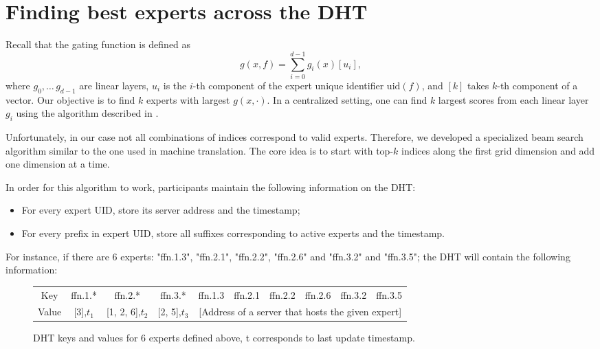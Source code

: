 \section{Finding best experts across the DHT}\label{appendix:find_experts}
\vspace{-2px}

Recall that the gating function is defined as 
\[
g(x, f) = \sum_{i=0}^{d - 1} g_i(x)[u_i],
\]
where $g_0,\dots\,g_{d-1}$ are linear layers, $u_i$ is the $i$-th component of the expert unique identifier $\mathrm{uid}(f)$, and $[k]$ takes $k$-th component of a vector. Our objective is to find $k$ experts with largest $g(x, \cdot)$. In a centralized setting, one can find $k$ largest scores from each linear layer $g_i$ using the algorithm described in \cite{pkm}.

Unfortunately, in our case not all combinations of indices correspond to valid experts. Therefore, we developed a specialized beam search algorithm similar to the one used in machine translation. The core idea is to start with top-$k$ indices along the first grid dimension and add one dimension at a time.

In order for this algorithm to work, participants maintain the following information on the DHT:

\begin{itemize}
    \item For every expert UID, store its server address and the timestamp;
    \item For every prefix in expert UID, store all suffixes corresponding to active experts and the timestamp.
\end{itemize}

For instance, if there are 6 experts: "ffn.1.3", "ffn.2.1", "ffn.2.2", "ffn.2.6" and "ffn.3.2" and "ffn.3.5"; the DHT will contain the following information:

\begin{figure}[h!]
    \centering
    \setlength{\tabcolsep}{3pt}
    \renewcommand{\arraystretch}{1.2}
    \begin{tabular}{c|c|c|c|c|c|c|c|c|c}
    \toprule
    Key    & ffn.1.*   & ffn.2.*         & ffn.3.*      & ffn.1.3 & ffn.2.1 & ffn.2.2 & ffn.2.6 & ffn.3.2 & ffn.3.5 \\
    Value  & [3],$t_1$ & [1, 2, 6],$t_2$ & [2, 5],$t_3$ & \multicolumn{6}{c}{[Address of a server that hosts the given expert]}\\
    \bottomrule
    \end{tabular}
    \caption{DHT keys and values for 6 experts defined above, t corresponds to last update timestamp.}
\end{figure}

